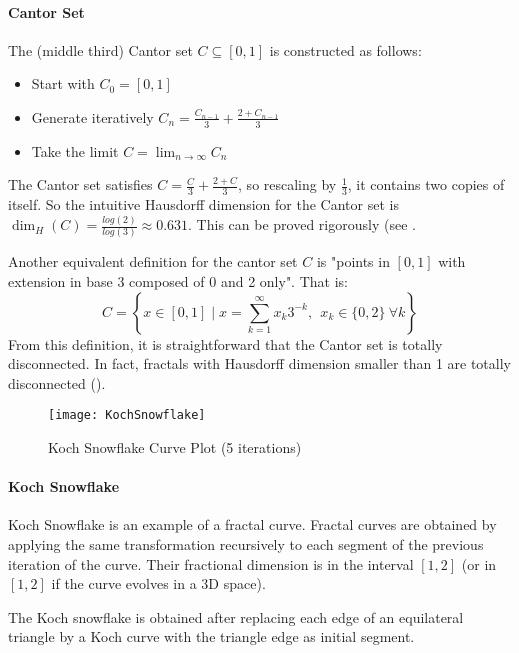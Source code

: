 \paragraph{Cantor Set}
The (middle third) Cantor set $C \subseteq \left[ 0,1 \right] $ is constructed as follows:
\begin{itemize}
	\item Start with $C_0 = \left[ 0,1 \right]$
	\item Generate iteratively $C_n = \frac{C_{n-1}}{3} + \frac{2 + C_{n-1}}{3}$
	\item Take the limit $C = \lim_{n \to \infty} C_n$
\end{itemize}

The Cantor set satisfies $C = \frac{C}{3} + \frac{2 + C}{3}$, so rescaling by $\frac{1}{3}$, it contains two copies of itself.
So the intuitive Hausdorff dimension for the Cantor set is $\dim_H(C) = \frac{log(2)}{log(3)} \approx 0.631$.
This can be proved rigorously (see \cite[p. 34-35, ex. 2.7]{Falconer_1990}.

Another equivalent definition for the cantor set $C$ is "points in $\left[ 0,1 \right]$ with extension in base 3 composed of 0 and 2 only".
That is:
$$
C = \left\lbrace x \in \left[ 0,1 \right] \mid x = \sum_{k=1}^{\infty} x_k 3^{-k}, \ \ x_k \in \{0,2\} \ \forall k \right\rbrace
$$
From this definition, it is straightforward that the Cantor set is totally disconnected.
In fact, fractals with Hausdorff dimension smaller than 1 are totally disconnected (\cite[p. 33, prop. 2.5]{Falconer_1990}).

\begin{wrapfigure}{r}{5cm}
	\vspace{-0.5cm}
	\texttt{[image: KochSnowflake]}
	\centering
	\captionsetup{justification=centering}
	\caption{Koch Snowflake Curve Plot (5 iterations)}
	\label{fig:KochSnowflake}
\end{wrapfigure}
\paragraph{Koch Snowflake}
Koch Snowflake is an example of a fractal curve.
Fractal curves are obtained by applying the same transformation recursively to each segment of the previous iteration of the curve.
Their fractional dimension is in the interval $\left[ 1,2 \right]$ (or in $\left[ 1,2 \right]$ if the curve evolves in a 3D space).

The Koch snowflake is obtained after replacing each edge of an equilateral triangle by a Koch curve with the triangle edge as initial segment.

